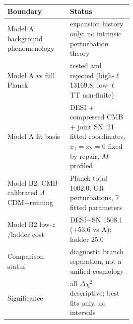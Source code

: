 {\footnotesize\setlength{\tabcolsep}{3pt}
\begin{tabular}{lp{0.50\linewidth}}
\toprule
Boundary & Status \\
\midrule
Model A: background phenomenology & expansion history only; no intrinsic perturbation theory \\
Model A vs full Planck & tested and rejected (high-$\ell$ 13169.8, low-$\ell$ TT non-finite) \\
Model A fit basis & DESI + compressed CMB + joint SN; 21 fitted coordinates, $x_{1}=x_{2}=0$ fixed by repair, $M$ profiled \\
Model B2: CMB-calibrated $\Lambda$CDM+running & Planck total 1002.0; GR perturbations, 7 fitted parameters \\
Model B2 low-$z$/ladder cost & DESI+SN 1508.1 (+53.6 vs A); ladder 25.0 \\
Comparison status & diagnostic branch separation, not a unified cosmology \\
Significance & all $\Delta\chi^{2}$ descriptive; best fits only, no intervals \\
\bottomrule
\end{tabular}}
